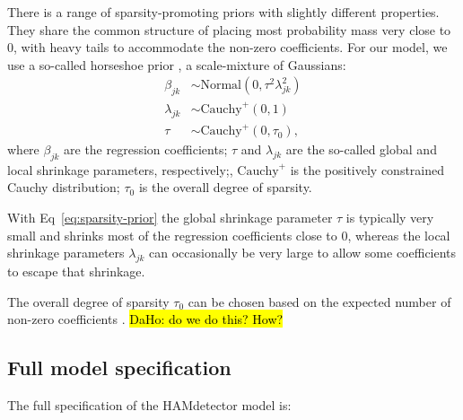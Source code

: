 \documentclass{bioinfo}
\begin{document}
\begin{methods}
There is a range of sparsity-promoting priors with slightly different properties. They share the common structure of placing most probability mass very close to 0, with heavy tails to accommodate the non-zero coefficients.
For our model, we use a so-called horseshoe prior \citep{Carvalho2010}, a scale-mixture of Gaussians:
\begin{equation}
  \label{eq:sparsity-prior}
  \begin{aligned}
    \beta_{jk} &\sim \text{Normal}(0, \tau^{2}\lambda^{2}_{jk}) \\
    \lambda_{jk} &\sim \text{Cauchy}^{+}(0, 1) \\
    \tau &\sim \text{Cauchy}^{+}(0, \tau_{0}),
  \end{aligned}
\end{equation}
where \(\beta_{jk}\) are the regression coefficients; \(\tau\) and \(\lambda_{jk}\) are the so-called global and local shrinkage parameters, respectively;, \(\text{Cauchy}^{+}\) is the positively constrained Cauchy distribution; $\tau_0$ is the overall degree of sparsity.

With Eq~\ref{eq:sparsity-prior} the global shrinkage parameter \(\tau\) is typically very small and shrinks most of the regression coefficients close to 0, whereas the local shrinkage parameters $\lambda_{jk}$ can occasionally be very large to allow some coefficients to escape that shrinkage.

The overall degree of sparsity $\tau_0$ can be chosen based on the expected number of non-zero coefficients \citep{Piironen2017}. \hl{DaHo: do we do this? How?}


\subsection{Full model specification}

The full specification of the HAMdetector model is:


\end{methods}
\end{document}
